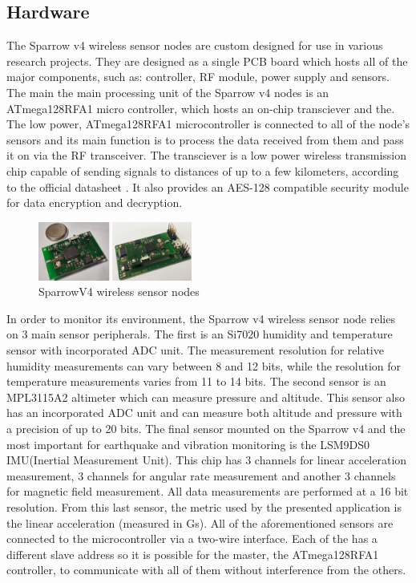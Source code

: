 \subsection{Hardware}

The Sparrow v4 wireless sensor nodes are custom designed for use in various research projects.
They are designed as a single PCB board which hosts all of the major components, such as: controller,
RF module, power supply and sensors. The main the main processing unit of the Sparrow v4 nodes is an ATmega128RFA1 micro controller, 
which hosts an on-chip transciever \cite{ATmega1281} and the. The low power, ATmega128RFA1 microcontroller is connected to all of the node's sensors and its
main function is to process the data received from them and pass it on via the RF transceiver. The transciever 
is a low power wireless transmission chip capable of sending signals to distances of up to a few kilometers, according 
to the official datasheet \cite{datasheetatmel}. It also provides an AES-128 compatible security module for data 
encryption and decryption.

\begin{figure}[ht] \centering
  \includegraphics[width=0.45\textwidth]{img/sparrow-v4.png}
  \caption{SparrowV4 wireless sensor nodes}
\end{figure}

In order to monitor its environment, the Sparrow v4 wireless sensor node relies on 3 main sensor peripherals. The first is 
an Si7020 humidity and temperature sensor\cite{Si7020} with incorporated ADC unit. The measurement resolution for relative humidity measurements
can vary between 8 and 12 bits, while the resolution for temperature measurements varies from 11 to 14 bits. The second sensor is 
an MPL3115A2 \cite{MPL3115A2} altimeter which can measure pressure and altitude. This sensor also has an incorporated ADC unit and can measure 
both altitude and pressure with a precision of up to 20 bits. The final sensor mounted on the Sparrow v4 and the most important for 
earthquake and vibration monitoring is the LSM9DS0 IMU(Inertial Measurement Unit)\cite{LSM9DS0}. This chip has 3 channels for linear acceleration measurement, 
3 channels for angular rate measurement and another 3 channels for magnetic field measurement. All data measurements are performed at a 
16 bit resolution. From this last sensor, the metric used by the presented application is the linear acceleration (measured in Gs).
All of the aforementioned sensors are connected to the microcontroller via a two-wire interface. Each of the has a different slave address so 
it is possible for the master, the ATmega128RFA1 controller, to communicate with all of them without interference from the others.

